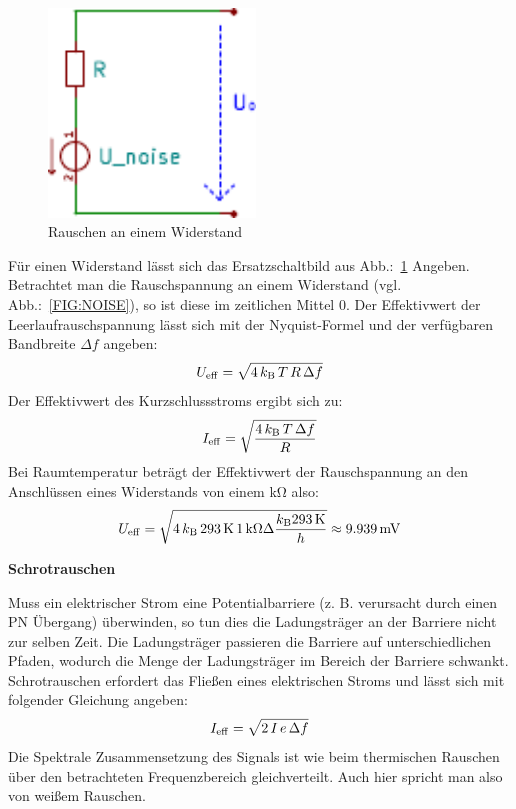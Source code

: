 \begin{figure}
  \centering
  \includegraphics[clip, width=0.49\textwidth]
  {./../common/schaltungen/widerstandsrauschen/widerstandsrauschen.pdf}
  \caption{Rauschen an einem Widerstand}\label{FIG:NOISEESB}
\end{figure}
Für einen Widerstand lässt sich das Ersatzschaltbild aus 
Abb.:~\ref{FIG:NOISEESB} Angeben.
Betrachtet man die Rauschspannung an einem Widerstand 
(vgl. Abb.:~\ref{FIG:NOISE}), so ist diese im zeitlichen Mittel 0.
Der Effektivwert der Leerlaufrauschspannung lässt sich mit der Nyquist-Formel 
und der verfügbaren Bandbreite $\Delta f$ angeben\cite[Nyquist]{Art:NYQUIST}:
\[U_{\rm eff} = \sqrt{4\, k_{\rm B}\, T\, R\, \Delta f}\]
Der Effektivwert des Kurzschlussstroms ergibt sich zu:
\[I_{\rm eff} = \sqrt{\frac{4\,k_{\rm B}\, T\, \Delta f}{R}}\]
Bei Raumtemperatur beträgt der Effektivwert der Rauschspannung an den 
Anschlüssen eines Widerstands von einem \si{\kilo\ohm} also:
\[U_{\rm eff} = 
\sqrt{4\, k_{\rm B}\, 293\,\si{\kelvin}\, 1\,\si{\kilo\ohm} \Delta 
\frac{k_{\rm B} 293\,\si{\kelvin}}{h}} \approx 9.939\,\si{\milli\volt}\]

\textbf{Schrotrauschen}

Muss ein elektrischer Strom eine Potentialbarriere (z. B. verursacht 
durch einen PN Übergang) überwinden, so tun dies die Ladungsträger an der 
Barriere nicht zur selben Zeit. Die Ladungsträger passieren die Barriere
auf unterschiedlichen Pfaden, wodurch die Menge der Ladungsträger im Bereich 
der Barriere schwankt.
Schrotrauschen erfordert das Fließen eines elektrischen Stroms und lässt sich 
mit folgender Gleichung angeben:
\[I_{\rm eff} = \sqrt{2\,I\,e\,\Delta f }\]
Die Spektrale Zusammensetzung des Signals ist wie beim thermischen Rauschen
über den betrachteten Frequenzbereich gleichverteilt.
Auch hier spricht man also von weißem Rauschen.  





